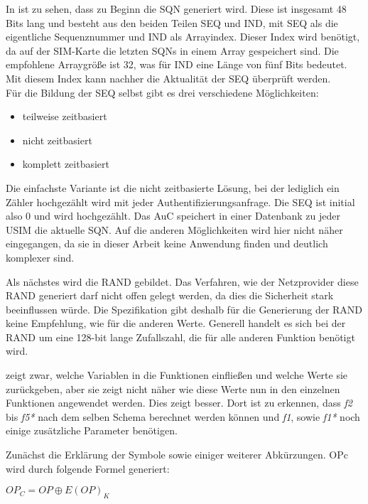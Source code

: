  In  ist zu sehen, dass zu Beginn die \ac{SQN} generiert wird.
 Diese ist insgesamt 48 Bits lang und besteht aus den beiden Teilen SEQ und IND, mit SEQ als
 die eigentliche Sequenznummer und IND als Arrayindex. Dieser Index wird benötigt, da auf
 der SIM-Karte die letzten SQNs in einem Array gespeichert sind. Die empfohlene Arraygröße ist
 32, was für IND eine Länge von fünf Bits bedeutet. Mit diesem Index kann nachher die
 Aktualität der SEQ überprüft werden.\cite{3gpp.33.102} \\
 Für die Bildung der SEQ selbst gibt es drei verschiedene Möglichkeiten:
 \begin{itemize}
  \item teilweise zeitbasiert
  \item nicht zeitbasiert
  \item komplett zeitbasiert
 \end{itemize}
 
 Die einfachste Variante ist die nicht zeitbasierte Lösung, bei der lediglich ein Zähler hochgezählt
 wird mit jeder Authentifizierungsanfrage. Die SEQ ist initial also 0 und wird hochgezählt. Das
 \ac{AuC} speichert in einer Datenbank \cite{3gpp.33.102} zu jeder USIM die aktuelle SQN.
 Auf die anderen  Möglichkeiten wird hier nicht näher eingegangen, da sie in dieser Arbeit
 keine Anwendung finden und deutlich komplexer sind.
 
 Als nächstes wird die RAND gebildet. Das Verfahren, wie der Netzprovider diese RAND
 generiert darf nicht offen gelegt werden, da dies die Sicherheit stark beeinflussen würde. Die
 Spezifikation gibt deshalb für die Generierung der RAND keine Empfehlung, wie für die anderen
 Werte. Generell handelt es sich bei der RAND um eine 128-bit lange Zufallszahl, die für alle
 anderen Funktion benötigt wird.
 
  zeigt zwar, welche Variablen in die Funktionen einfließen und
 welche Werte sie zurückgeben, aber sie zeigt nicht näher wie diese Werte nun in den einzelnen
 Funktionen angewendet werden. Dies zeigt  besser. Dort ist
 zu erkennen, dass \emph{f2} bis \emph{f5*} nach dem selben Schema berechnet werden können und
 \emph{f1}, sowie \emph{f1*} noch einige zusätzliche Parameter benötigen.
 
 Zunächst die Erklärung der Symbole sowie einiger weiterer Abkürzungen. OPc wird durch
 folgende Formel generiert:
 \begin{center}
  $OP_{C} = OP \oplus E(OP)_{K}$
 \end{center}
 
